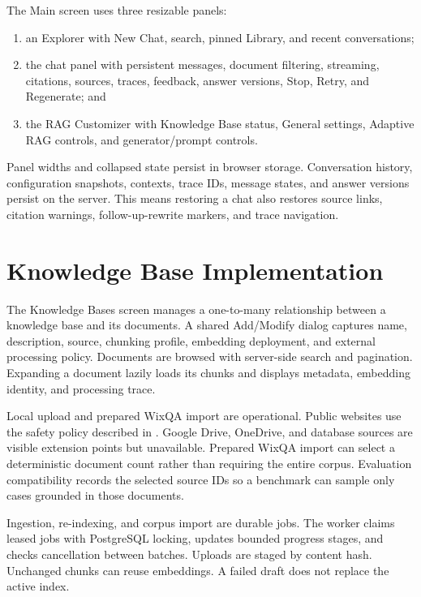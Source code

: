 The Main screen uses three resizable panels:

\begin{enumerate}
  \item an Explorer with New Chat, search, pinned Library, and recent
  conversations;
  \item the chat panel with persistent messages, document filtering, streaming,
  citations, sources, traces, feedback, answer versions, Stop, Retry, and
  Regenerate; and
  \item the RAG Customizer with Knowledge Base status, General settings,
  Adaptive RAG controls, and generator/prompt controls.
\end{enumerate}

Panel widths and collapsed state persist in browser storage. Conversation
history, configuration snapshots, contexts, trace IDs, message states, and
answer versions persist on the server. This means restoring a chat also
restores source links, citation warnings, follow-up-rewrite markers, and trace
navigation.


\section{Knowledge Base Implementation}

The Knowledge Bases screen manages a one-to-many relationship between a
knowledge base and its documents. A shared Add/Modify dialog captures name,
description, source, chunking profile, embedding deployment, and external
processing policy. Documents are browsed with server-side search and
pagination. Expanding a document lazily loads its chunks and displays metadata,
embedding identity, and processing trace.

Local upload and prepared WixQA import are operational. Public websites use the
safety policy described in . Google Drive, OneDrive, and
database sources are visible extension points but unavailable. Prepared WixQA
import can select a deterministic document count rather than requiring the
entire corpus. Evaluation compatibility records the selected source IDs so a
benchmark can sample only cases grounded in those documents.

Ingestion, re-indexing, and corpus import are durable jobs. The worker claims
leased jobs with PostgreSQL locking, updates bounded progress stages, and
checks cancellation between batches. Uploads are staged by content hash.
Unchanged chunks can reuse embeddings. A failed draft does not replace the
active index.

